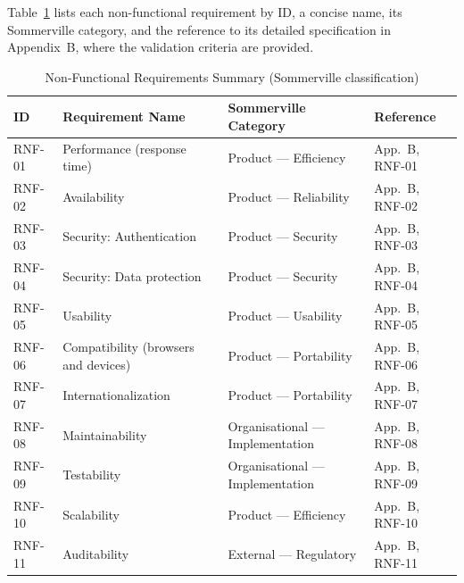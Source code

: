 \documentclass[11pt,a4paper,oneside]{report}
\begin{document}
Table~\ref{tab:nfr-summary} lists each non-functional requirement by ID, a concise name, its Sommerville category, and the reference to its detailed specification in Appendix~B, where the validation criteria are provided.

\begin{table}[h]
    \centering
    \caption{Non-Functional Requirements Summary (Sommerville classification)}
    \label{tab:nfr-summary}
    \begin{tabularx}{\textwidth}{>{\raggedright\arraybackslash}p{1.5cm} >{\raggedright\arraybackslash}X >{\raggedright\arraybackslash}p{4.0cm} >{\raggedright\arraybackslash}p{2.3cm}}
        \toprule
        \textbf{ID} & \textbf{Requirement Name} & \textbf{Sommerville Category} & \textbf{Reference} \\
        \midrule
        RNF-01 & Performance (response time)            & Product --- Efficiency            & App.~B, RNF-01 \\
        RNF-02 & Availability                            & Product --- Reliability           & App.~B, RNF-02 \\
        RNF-03 & Security: Authentication                & Product --- Security              & App.~B, RNF-03 \\
        RNF-04 & Security: Data protection               & Product --- Security              & App.~B, RNF-04 \\
        RNF-05 & Usability                               & Product --- Usability             & App.~B, RNF-05 \\
        RNF-06 & Compatibility (browsers and devices)    & Product --- Portability           & App.~B, RNF-06 \\
        RNF-07 & Internationalization                    & Product --- Portability           & App.~B, RNF-07 \\
        RNF-08 & Maintainability                         & Organisational --- Implementation & App.~B, RNF-08 \\
        RNF-09 & Testability                             & Organisational --- Implementation & App.~B, RNF-09 \\
        RNF-10 & Scalability                             & Product --- Efficiency            & App.~B, RNF-10 \\
        RNF-11 & Auditability                            & External --- Regulatory           & App.~B, RNF-11 \\
        \bottomrule
    \end{tabularx}
\end{table}
\end{document}
